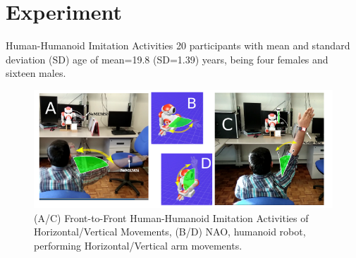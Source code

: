 \section{Experiment}

{
\begin{frame}{Human-Humanoid Imitation Activities}
20 participants with mean and standard deviation (SD) age of 
mean=19.8 (SD=1.39) years, being four females and sixteen males.
    \begin{figure}
        \includegraphics[width=0.9\linewidth]{./figs/experiment/versions/drawing-v00}{}
	\caption[PA]{(A/C) Front-to-Front Human-Humanoid Imitation 
		Activities of Horizontal/Vertical Movements,
		(B/D) NAO, humanoid robot, performing 
		Horizontal/Vertical arm movements.
		}
   \end{figure}
\end{frame}
}


